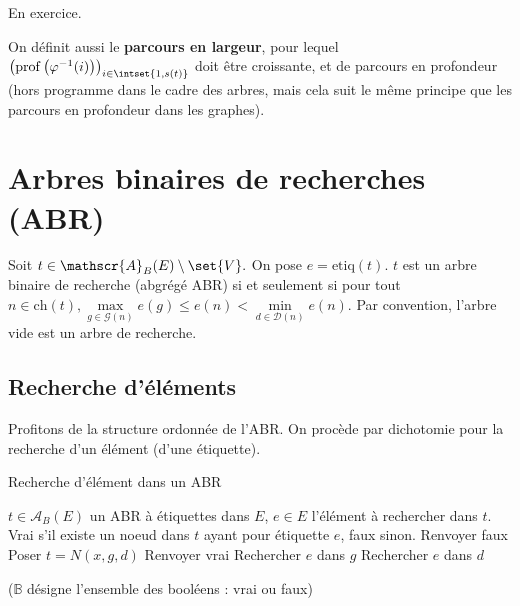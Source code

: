 \documentclass{scrartcl}
\begin{document}
			\begin{demo}
				\item En exercice.
			\end{demo}
			
			On définit aussi le \textbf{parcours en largeur}, pour lequel $\left(\mathrm{prof}\left(\varphi^{-1}(i)\right)\right)_{i \in \intset{1,s(t)}}$ doit être croissante,
			et de parcours en profondeur (hors programme dans le cadre des arbres, mais cela suit le même principe que les parcours en profondeur dans les graphes).

	\section{Arbres binaires de recherches (ABR)}

		Soit $t \in \mathscr{A}_B(E) \setminus \set{V}.$ On pose $e = \mathrm{etiq}(t)$.
		$t$ est un arbre binaire de recherche (abgrégé ABR) si et seulement si pour tout $n \in \mathrm{ch}(t), \max\limits_{g \in \mathscr{G}(n)} e(g) \leq e(n) < \min\limits_{d \in \mathscr{D}(n)} e(n)$. Par convention, l'arbre vide est un arbre de recherche.

		\subsection{Recherche d'éléments}
			Profitons de la structure ordonnée de l'ABR. On procède par dichotomie pour la recherche d'un élément (d'une étiquette).
			
			\begin{algorithm}[H]
				\caption{Recherche d'élément dans un ABR}
				\Entree
				{
					$t \in \mathscr{A}_B(E)$ un ABR à étiquettes dans $E$,
					$e \in E$ l'élément à rechercher dans $t$.
				}
				\Sortie
				{
					Vrai s'il existe un noeud dans $t$ ayant pour étiquette $e$, faux sinon.
				}
				{
					Renvoyer faux
				}
				{
					Poser $t = N(x,g,d)$ \;
					{
						Renvoyer vrai
					}
					{
						{
							Rechercher $e$ dans $g$
						}
						{
							Rechercher $e$ dans $d$
						}
					}
				}
			\end{algorithm}
			($\mathbb{B}$ désigne l'ensemble des booléens : vrai ou faux)
\end{document}
